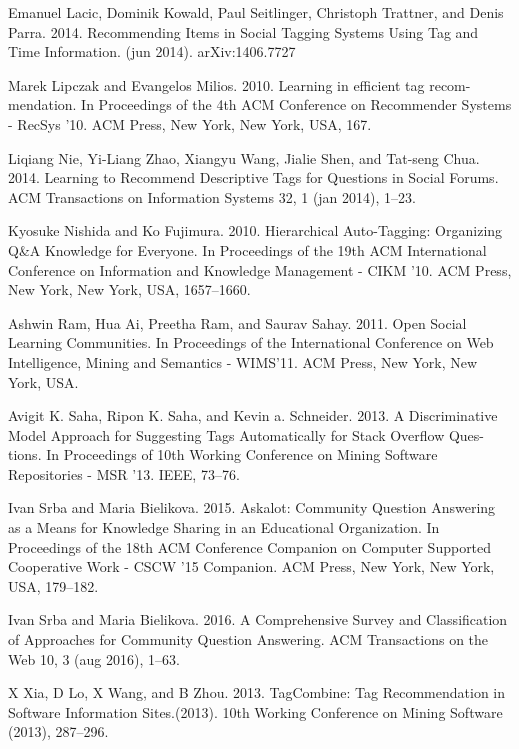 \documentclass{sig-alternate}
\begin{document}
\begin{thebibliography}{9}
\bibitem{} 
Emanuel Lacic, Dominik Kowald, Paul Seitlinger, Christoph Trattner, and Denis
Parra. 2014. Recommending Items in Social Tagging Systems Using Tag and
Time Information. (jun 2014). arXiv:1406.7727

\bibitem{} 
Marek Lipczak and Evangelos Milios. 2010. Learning in efficient tag recom-
mendation. In Proceedings of the 4th ACM Conference on Recommender Systems -
RecSys ’10. ACM Press, New York, New York, USA, 167.

\bibitem{} 
Liqiang Nie, Yi-Liang Zhao, Xiangyu Wang, Jialie Shen, and Tat-seng Chua. 2014.
Learning to Recommend Descriptive Tags for Questions in Social Forums. ACM
Transactions on Information Systems 32, 1 (jan 2014), 1–23.

\bibitem{} 
Kyosuke Nishida and Ko Fujimura. 2010. Hierarchical Auto-Tagging: Organizing
Q&A Knowledge for Everyone. In Proceedings of the 19th ACM International
Conference on Information and Knowledge Management - CIKM ’10. ACM Press,
New York, New York, USA, 1657–1660.

\bibitem{} 
Ashwin Ram, Hua Ai, Preetha Ram, and Saurav Sahay. 2011. Open Social Learning
Communities. In Proceedings of the International Conference on Web Intelligence,
Mining and Semantics - WIMS’11. ACM Press, New York, New York, USA.

\bibitem{} 
Avigit K. Saha, Ripon K. Saha, and Kevin a. Schneider. 2013. A Discriminative
Model Approach for Suggesting Tags Automatically for Stack Overflow Ques-
tions. In Proceedings of 10th Working Conference on Mining Software Repositories -
MSR ’13. IEEE, 73–76.

\bibitem{} 
Ivan Srba and Maria Bielikova. 2015. Askalot: Community Question Answering
as a Means for Knowledge Sharing in an Educational Organization. In Proceedings
of the 18th ACM Conference Companion on Computer Supported Cooperative Work
- CSCW ’15 Companion. ACM Press, New York, New York, USA, 179–182.

\bibitem{} 
Ivan Srba and Maria Bielikova. 2016. A Comprehensive Survey and Classification
of Approaches for Community Question Answering. ACM Transactions on the
Web 10, 3 (aug 2016), 1–63.

\bibitem{} 
X Xia, D Lo, X Wang, and B Zhou. 2013. TagCombine: Tag Recommendation in
Software Information Sites.(2013). 10th Working Conference on Mining Software
(2013), 287–296.

\end{thebibliography}

\balancecolumns
\end{document}
